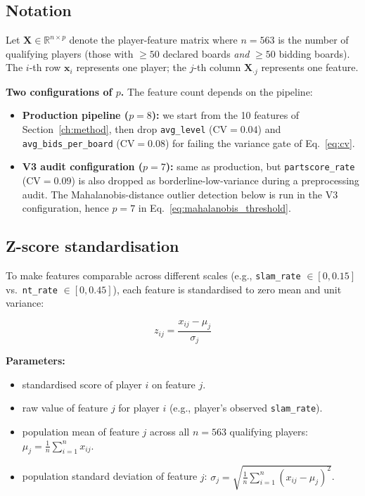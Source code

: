 \documentclass[11pt, a4paper, oneside, openany]{report}
\begin{document}
\subsection{Notation}

Let $\mathbf{X} \in \mathbb{R}^{n \times p}$ denote the player-feature matrix where $n = 563$ is the number of qualifying players (those with $\geq 50$ declared boards \emph{and} $\geq 50$ bidding boards). The $i$-th row $\mathbf{x}_i$ represents one player; the $j$-th column $\mathbf{X}_{\cdot j}$ represents one feature.

\textbf{Two configurations of $p$.} The feature count depends on the pipeline:
\begin{itemize}[leftmargin=*, itemsep=0pt, topsep=2pt]
    \item \textbf{Production pipeline ($p = 8$):} we start from the 10 features of Section~\ref{ch:method}, then drop \texttt{avg\_level} ($\mathrm{CV} = 0.04$) and \texttt{avg\_bids\_per\_board} ($\mathrm{CV} = 0.08$) for failing the variance gate of Eq.~\eqref{eq:cv}.
    \item \textbf{V3 audit configuration ($p = 7$):} same as production, but \texttt{partscore\_rate} ($\mathrm{CV} = 0.09$) is also dropped as borderline-low-variance during a preprocessing audit. The Mahalanobis-distance outlier detection below is run in the V3 configuration, hence $p = 7$ in Eq.~\eqref{eq:mahalanobis_threshold}.
\end{itemize}

\subsection{Z-score standardisation}

To make features comparable across different scales (e.g., \texttt{slam\_rate} $\in [0, 0.15]$ vs.\ \texttt{nt\_rate} $\in [0, 0.45]$), each feature is standardised to zero mean and unit variance:

\begin{equation}
\label{eq:zscore}
z_{ij} = \frac{x_{ij} - \mu_j}{\sigma_j}
\end{equation}

\noindent\textbf{Parameters:}
\begin{itemize}[leftmargin=2.2cm, itemsep=0pt, topsep=2pt]
    \item[$z_{ij}$] standardised score of player $i$ on feature $j$.
    \item[$x_{ij}$] raw value of feature $j$ for player $i$ (e.g., player's observed \texttt{slam\_rate}).
    \item[$\mu_j$] population mean of feature $j$ across all $n = 563$ qualifying players: $\mu_j = \tfrac{1}{n}\sum_{i=1}^{n} x_{ij}$.
    \item[$\sigma_j$] population standard deviation of feature $j$: $\sigma_j = \sqrt{\tfrac{1}{n}\sum_{i=1}^{n}(x_{ij} - \mu_j)^2}$.
\end{itemize}
\end{document}

